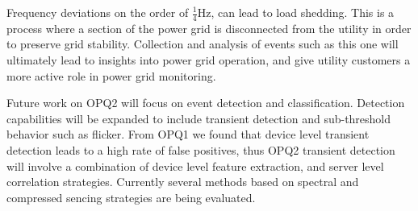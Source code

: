 \documentclass[a4paper, conference]{IEEEtran}
\begin{document}
Frequency deviations on the order of $\frac{1}{4}$Hz, can lead to load shedding\cite{GE_LS}. This is a process where a section of the power grid is disconnected from the utility in order to preserve grid stability. Collection and analysis of events such as this one will ultimately lead to insights into power grid operation, and give utility customers a more active role in power grid monitoring.

Future work on OPQ2 will focus on event detection and classification. Detection capabilities will be expanded to include transient detection and sub-threshold behavior such as flicker. From OPQ1 we found that device level transient detection leads to a high rate of false positives, thus OPQ2 transient detection will involve a combination of device level feature extraction, and server level correlation strategies. Currently several methods based on spectral and compressed sencing strategies are being evaluated. 


%



%
%





\end{document}
